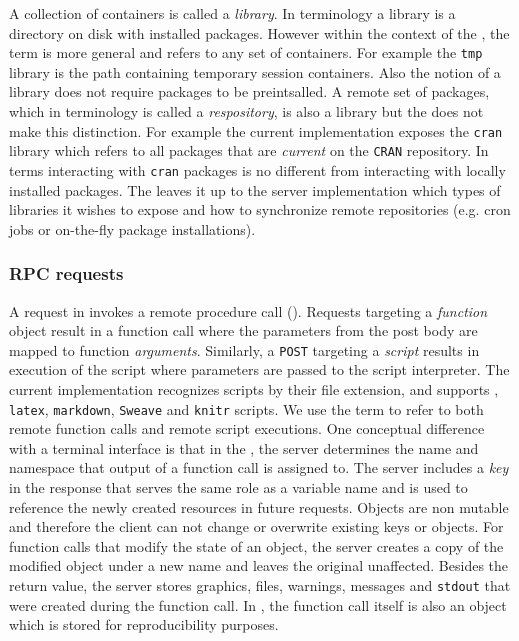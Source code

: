 A collection of containers is called a \emph{library}. In \R terminology a library is a directory on disk with installed packages. However within the context of the \API, the term is more general and refers to any set of containers. For example the \texttt{tmp} library is the \API path containing temporary session containers. Also the \API notion of a library does not require packages to be preintsalled. A remote set of packages, which in \R terminology is called a \emph{respository}, is also a library but the \API does not make this distinction. For example the current implementation exposes the \texttt{cran} library which refers to all packages that are \emph{current} on the \texttt{CRAN} repository. In \API terms interacting with \texttt{cran} packages is no different from interacting with locally installed packages. The \API leaves it up to the server implementation which types of libraries it wishes to expose and how to synchronize remote repositories (e.g. cron jobs or on-the-fly package installations).

\subsubsection{RPC requests}

A \POST request in \OpenCPU invokes a remote procedure call (\RPC). Requests targeting a \emph{function} object result in a function call where the \HTTP parameters from the post body are mapped to function \emph{arguments}. Similarly, a \texttt{POST} targeting a \emph{script} results in execution of the script where \HTTP parameters are passed to the script interpreter. The current \OpenCPU implementation recognizes scripts by their file extension, and supports \R, \texttt{latex}, \texttt{markdown}, \texttt{Sweave} and \texttt{knitr} scripts. We use the term \RPC to refer to both remote function calls and remote script executions. One conceptual difference with a terminal interface is that in the \OpenCPU \API, the server determines the name and namespace that output of a function call is assigned to. The server includes a \emph{key} in the \RPC response that serves the same role as a variable name and is used to reference the newly created resources in future requests. Objects are non mutable and therefore the client can not change or overwrite existing keys or objects. For function calls that modify the state of an object, the server creates a copy of the modified object under a new name and leaves the original unaffected. Besides the return value, the server stores graphics, files, warnings, messages and \texttt{stdout} that were created during the function call. In \R, the function call itself is also an object which is stored for reproducibility purposes.

